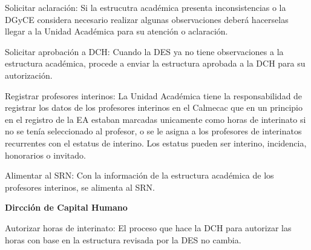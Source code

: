 \begin{PDescripcion}
\begin{enumerate}
		\Ppaso[\itarea] Solicitar aclaración: Si la estrucutra académica presenta inconsistencias o la DGyCE considera necesario realizar algunas observaciones deberá hacerselas llegar a la Unidad Académica para su atención o aclaración.
		
		\Ppaso[\PSubProceso] Solicitar aprobación a DCH: Cuando la DES ya no tiene observaciones a la estructura académica, procede a enviar la estructura aprobada a la DCH para su autorización.
		
	
		\Ppaso[\itarea] Registrar profesores interinos: La Unidad Académica tiene la responsabilidad de registrar los datos de los profesores interinos en el Calmecac que en un principio en el registro de la EA estaban marcadas unicamente como horas de interinato si no se tenía seleccionado al profesor, o se le asigna a los profesores de interinatos recurrentes con el estatus de interino. Los estatus pueden ser interino, incidencia, honorarios o invitado.
		
		\Ppaso[\itarea] Alimentar al SRN: Con la información de la estructura académica de los profesores interinos, se alimenta al SRN.
	\end{enumerate}
	
	\Ppaso \textbf{Dircción de Capital Humano}
	\begin{enumerate}
		\Ppaso[\itarea] Autorizar horas de interinato: El proceso que hace la DCH para autorizar las horas con base en la estructura revisada por la DES no cambia.
		
	\end{enumerate}

\end{PDescripcion}










